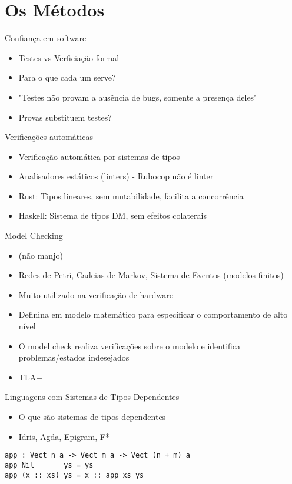 \documentclass[presentation]{beamer}
\begin{document}
\section{Os Métodos}
\label{sec:org3705e81}

\begin{frame}[label={sec:orgf1ed021}]{Confiança em software}
\begin{itemize}
\item Testes vs Verficiação formal
\item Para o que cada um serve?
\item "Testes não provam a ausência de bugs, somente a presença deles"
\item Provas substituem testes?
\end{itemize}
\end{frame}

\begin{frame}[label={sec:org49c86fd}]{Verificações automáticas}
\begin{itemize}
\item Verificação automática por sistemas de tipos
\item Analisadores estáticos (linters) - Rubocop não é linter
\item Rust: Tipos lineares, sem mutabilidade, facilita a concorrência
\item Haskell: Sistema de tipos DM, sem efeitos colaterais
\end{itemize}
\end{frame}

\begin{frame}[label={sec:orgac8c9f3}]{Model Checking}
\begin{itemize}
\item (não manjo)
\item Redes de Petri, Cadeias de Markov, Sistema de Eventos (modelos finitos)
\item Muito utilizado na verificação de hardware
\item Definina em modelo matemático para especificar o comportamento de alto nível
\item O model check realiza verificações sobre o modelo e identifica problemas/estados indesejados
\item TLA+
\end{itemize}
\end{frame}

\begin{frame}[fragile,label={sec:orga608c83}]{Linguagens com Sistemas de Tipos Dependentes}
 \begin{itemize}
\item O que são sistemas de tipos dependentes
\item Idris, Agda, Epigram, F*
\end{itemize}
\begin{verbatim}
app : Vect n a -> Vect m a -> Vect (n + m) a
app Nil       ys = ys
app (x :: xs) ys = x :: app xs ys
\end{verbatim}
\end{frame}
\end{document}
